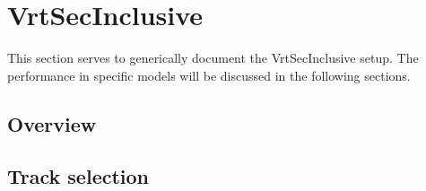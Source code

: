 
%
\section{VrtSecInclusive \label{sec:VSI} }
%

This section serves to generically document the VrtSecInclusive setup.
The performance in specific models will be discussed in the following sections.

%
\subsection{Overview \label{sec:LRT:Overview} }
%

%
\subsection{Track selection \label{sec:LRT:TrackSelection} }
%
